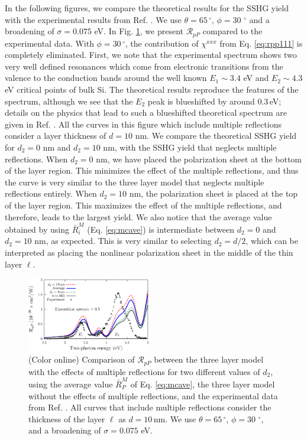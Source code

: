 \documentclass[aps,prb,10pt,showpacs,letterpaper,twocolumn]{revtex4-1}
\begin{document}
In the following figures, we compare the theoretical results for the SSHG yield
with the experimental results from Ref. . We use $\theta
= 65\,^{\circ}$, $\phi = 30\,\,^{\circ}$ and a broadening of $\sigma = 0.075$
eV. In Fig. \ref{fig:d2values}, we present $\mathcal{R}_{pP}$ compared to the
experimental data. With $\phi = 30\,^{\circ}$, the contribution of $\chi^{xxx}$
from Eq. \eqref{eq:rpp111} is completely eliminated. First, we note that the
experimental spectrum shows two very well defined resonances which come from
electronic transitions from the valence to the conduction bands around the well
known $E_{1}\sim 3.4$ eV and $E_{2}\sim 4.3$ eV critical points of bulk
Si.\cite{yubook} The theoretical results reproduce the features of the spectrum,
although we see that the $E_{2}$ peak is blueshifted by around 0.3\,eV; details
on the physics that lead to such a blueshifted theoretical spectrum are given in
Ref. . All the curves in this figure which include
multiple reflections consider a layer thickness of $d = 10$ nm. We compare the
theoretical SSHG yield for $d_{2} = 0$ nm and $d_{2} = 10$ nm, with the SSHG
yield that neglects multiple reflections. When $d_{2} = 0$ nm, we have placed
the polarization sheet at the bottom of the layer region. This minimizes the
effect of the multiple reflections, and thus the curve is very similar to the
three layer model that neglects multiple reflections entirely. When $d_{2} = 10$
nm, the polarization sheet is placed at the top of the layer region. This
maximizes the effect of the multiple reflections, and therefore, leads to the
largest yield. We also notice that the average value obtained by using
$\bar{R}^{M}_{i}$ (Eq. \eqref{eq:mcave}) is intermediate between $d_{2} = 0$ and
$d_{2} = 10$ nm, as expected. This is very similar to selecting $d_{2} = d/2$,
which can be interpreted as placing the nonlinear polarization sheet in the
middle of the thin layer $\ell$.

\begin{figure}[t]
\includegraphics[width=0.48\textwidth]{figures/fig3}
\caption{(Color online) Comparison of $\mathcal{R}_{pP}$ between the three layer
model with the effects of multiple reflections for two different values of
$d_{2}$, using the average value $\bar{R}^{M}_P$ of Eq. \eqref{eq:mcave}, the
three layer model without the effects of multiple reflections, and the
experimental data from Ref. . All curves that include
multiple reflections consider the thickness of the layer $\ell$ as $d =
10\,\mathrm{nm}$. We use $\theta = 65\,^{\circ}$, $\phi = 30\,\,^{\circ}$, and a
broadening of $\sigma = 0.075$ eV.}
\label{fig:d2values}
\end{figure}
\end{document}
